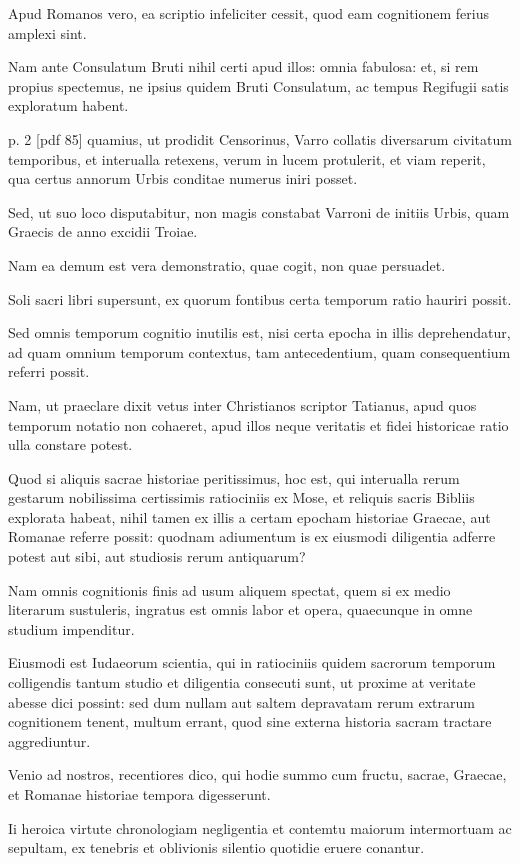 Apud Romanos vero,
ea scriptio infeliciter cessit, quod eam cognitionem ferius amplexi sint.

Nam ante Consulatum Bruti nihil certi apud illos: omnia fabulosa: et,
si rem propius spectemus, ne ipsius quidem Bruti Consulatum, ac tempus
Regifugii satis exploratum habent.

p. 2 [pdf 85]
%
quamius, ut prodidit Censorinus,
Varro collatis diversarum civitatum temporibus, et interualla retexens,
verum in lucem protulerit, et viam reperit, qua certus
annorum Urbis conditae numerus iniri posset.

Sed, ut suo loco disputabitur,
non magis constabat Varroni de initiis Urbis, quam Graecis de
anno excidii Troiae.

Nam ea demum est vera demonstratio, quae cogit,
non quae persuadet.

Soli sacri libri supersunt, ex quorum fontibus
certa temporum ratio hauriri possit.

Sed omnis temporum cognitio
inutilis est, nisi certa epocha in illis deprehendatur, ad quam omnium
temporum contextus, tam antecedentium, quam consequentium referri
possit.

Nam, ut praeclare dixit vetus inter Christianos scriptor
Tatianus, apud quos temporum notatio non cohaeret, apud illos neque
veritatis et fidei historicae ratio ulla constare potest.

Quod si aliquis
sacrae historiae peritissimus, hoc est, qui interualla rerum gestarum
nobilissima certissimis ratiociniis ex Mose, et
 reliquis sacris Bibliis explorata
habeat, nihil tamen ex illis a certam epocham historiae Graecae,
aut Romanae referre possit: quodnam adiumentum is ex eiusmodi
diligentia adferre potest aut sibi, aut studiosis rerum antiquarum?

Nam omnis cognitionis finis ad usum aliquem spectat, quem si ex medio
literarum sustuleris, ingratus est omnis labor et opera, quaecunque
in omne studium impenditur.

Eiusmodi est Iudaeorum scientia, qui
in ratiociniis quidem sacrorum temporum colligendis tantum studio
et diligentia consecuti sunt, ut proxime at veritate abesse dici possint: sed
dum nullam aut saltem depravatam rerum extrarum cognitionem
tenent, multum errant, quod sine externa historia sacram tractare
aggrediuntur.

Venio ad nostros, recentiores dico, qui hodie summo
cum fructu, sacrae, Graecae, et Romanae historiae tempora digesserunt.

Ii heroica virtute chronologiam negligentia et contemtu maiorum
intermortuam ac sepultam, ex tenebris et oblivionis silentio quotidie
eruere conantur.

